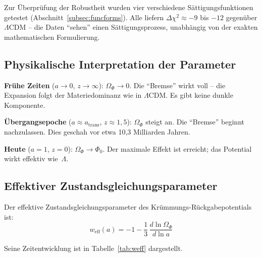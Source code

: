 \documentclass[aps,prd,twocolumn,superscriptaddress,nofootinbib]{revtex4-2}
\begin{document}
Zur Überprüfung der Robustheit wurden vier verschiedene Sättigungsfunktionen getestet (Abschnitt~\ref{subsec:funcforms}). Alle liefern $\Delta\chi^2 \approx -9$ bis $-12$ gegenüber $\Lambda$CDM -- die Daten ``sehen'' einen Sättigungsprozess, unabhängig von der exakten mathematischen Formulierung.

\subsection{Physikalische Interpretation der Parameter}
\label{subsec:interpretation}

\textbf{Frühe Zeiten} ($a \to 0$, $z \to \infty$): $\Omega_\Phi \to 0$. Die ``Bremse'' wirkt voll -- die Expansion folgt der Materiedominanz wie in $\Lambda$CDM. Es gibt keine dunkle Komponente.

\textbf{Übergangsepoche} ($a \approx a_{\mathrm{trans}}$, $z \approx 1{,}5$): $\Omega_\Phi$ steigt an. Die ``Bremse'' beginnt nachzulassen. Dies geschah vor etwa 10,3 Milliarden Jahren.

\textbf{Heute} ($a = 1$, $z = 0$): $\Omega_\Phi \to \Phi_0$. Der maximale Effekt ist erreicht; das Potential wirkt effektiv wie~$\Lambda$.

\subsection{Effektiver Zustandsgleichungsparameter}
\label{subsec:weff}

Der effektive Zustandsgleichungsparameter des Krümmungs-Rückgabepotentials ist:
\begin{equation}
w_{\mathrm{eff}}(a) = -1 - \frac{1}{3}\,\frac{d\ln\Omega_\Phi}{d\ln a}
\label{eq:weff}
\end{equation}

Seine Zeitentwicklung ist in Tabelle~\ref{tab:weff} dargestellt.
\end{document}
